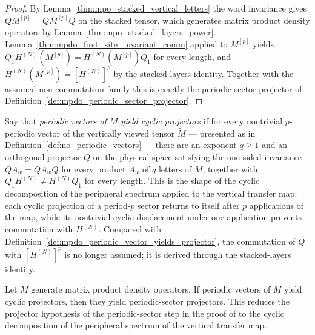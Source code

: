 \begin{proof}
    \leanok
    By Lemma~\ref{thm:mpo_stacked_vertical_letters} the word invariance
    gives $QM^{[p]}=QM^{[p]}Q$ on the stacked tensor, which generates matrix
    product density operators by
    Lemma~\ref{thm:mpo_stacked_layers_power}.
    Lemma~\ref{thm:mpdo_first_site_invariant_comm} applied to $M^{[p]}$
    yields $Q_1H^{(N)}(M^{[p]})=H^{(N)}(M^{[p]})Q_1$ for every length, and
    $H^{(N)}(M^{[p]})=[H^{(N)}]^p$ by the stacked-layers identity. Together
    with the assumed non-commutation family this is exactly the
    periodic-sector projector of
    Definition~\ref{def:mpdo_periodic_sector_projector}.
\end{proof}

\begin{definition}
    \label{def:mpdo_periodic_vector_yields_cyclic_projector}
    \leanok
    Say that \emph{periodic vectors of $M$ yield cyclic projectors} if for
    every nontrivial $p$-periodic vector of the vertically viewed tensor
    $\widetilde M$ --- presented as in
    Definition~\ref{def:no_periodic_vectors} --- there are an exponent
    $q\ge 1$ and an orthogonal projector $Q$ on the physical space
    satisfying the one-sided invariance $QA_w=QA_wQ$ for every product
    $A_w$ of $q$ letters of $\widetilde M$, together with
    $Q_1H^{(N)}\ne H^{(N)}Q_1$ for every length. This is the shape of the
    cyclic decomposition of the peripheral spectrum
    \cite[Theorem~6.6]{Wolf2012Quantum} applied to the vertical transfer
    map: each cyclic projection of a period-$p$ sector returns to itself
    after $p$ applications of the map, while its nontrivial cyclic
    displacement under one application prevents commutation with
    $H^{(N)}$. Compared with
    Definition~\ref{def:mpdo_periodic_vector_yields_projector}, the
    commutation of $Q$ with $[H^{(N)}]^p$ is no longer assumed; it is
    derived through the stacked-layers identity.
\end{definition}

\begin{lemma}
    \label{thm:mpdo_cyclic_projector_reduction}
    \leanok
    Let $M$ generate matrix product density operators. If periodic vectors
    of $M$ yield cyclic projectors, then they yield periodic-sector
    projectors. This reduces the projector hypothesis of the
    periodic-sector step in the proof of
    \cite[Proposition~4.13, lines~1888--1893]{Cirac2016MPDO_arXiv} to the
    cyclic decomposition of the peripheral spectrum of the vertical
    transfer map.
\end{lemma}

